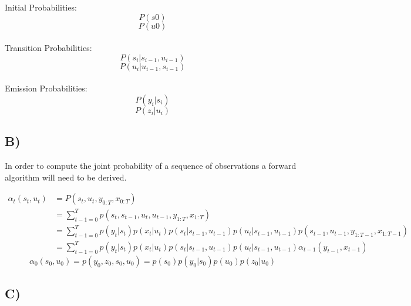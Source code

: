 \documentclass{report}
\begin{document}
Initial Probabilities:
\begin{equation}
  P(s0)
\end{equation}
\begin{equation}
  P(u0)
\end{equation}\\

Transition Probabilities:
\begin{equation}
  P(s_i | s_{i-1}, u_{i-1})
\end{equation}
\begin{equation}
  P(u_i | u_{i-1}, s_{i-1})
\end{equation}\\

Emission Probabilities:
\begin{equation}
  P(y_i | s_i)
\end{equation}
\begin{equation}
  P(z_i | u_i)
\end{equation}

\subsection*{B)}
In order to compute the joint probability of a sequence of observations a
forward algorithm will need to be derived.


\begin{equation}
  \begin{aligned}
  \alpha_t(s_t, u_t) & = P(s_t, u_t, y_{0:T}, x_{0:T})\\
   & = \sum_{t-1 = 0}^T p(s_t, s_{t-1}, u_t, u_{t-1}, y_{1:T}, x_{1:T})\\
   & = \sum_{t-1 = 0}^T p(y_t | s_t) p(x_t | u_t) p(s_t | s_{t-1}, u_{t-1}) p(u_t | s_{t-1}, u_{t-1}) p(s_{t-1}, u_{t-1}, y_{1:T-1}, x_{1:T-1})\\
   & = \sum_{t-1 = 0}^T p(y_t | s_t) p(x_t | u_t) p(s_t | s_{t-1}, u_{t-1}) p(u_t | s_{t-1}, u_{t-1}) \alpha_{t-1}(y_{t-1}, x_{t-1})
  \end{aligned}
\end{equation}
\begin{equation}
  \alpha_0 (s_0, u_0) = p(y_0, z_0, s_0, u_0) = p(s_0) p(y_0 | s_0) p(u_0) p(z_0 | u_0)
\end{equation}

\subsection*{C)}
\end{document}

